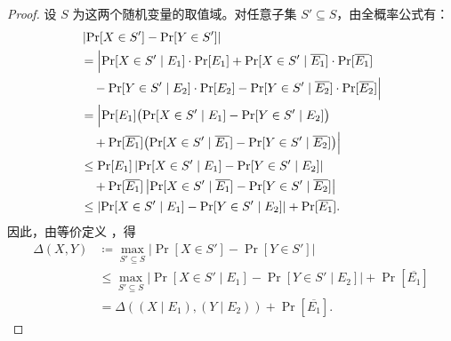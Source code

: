 \documentclass[american,singlepageview]{snargs-book-zh}
\newcommand{\DefineEqual}{\coloneqq}
\newcommand{\Event}{E}
\newcommand{\ConditionedOn}{\;\vert\;}
\newcommand{\RandomVariableX}{X}
\newcommand{\RandomVariableY}{Y}
\newcommand{\RandomVariableSupport}{S}
\newcommand{\StatisticalDistanceSymbol}{\Delta}
\newcommand{\StatisticalDistance}[2]{\StatisticalDistanceSymbol\left(#1,#2\right)}
\newcommand{\Negate}[1]{\overline{#1}}
\newcommand{\AbsValue}[1]{\left|{#1}\right|}
\begin{document}
\begin{proof}
设 $\RandomVariableSupport$ 为这两个随机变量的取值域。对任意子集 $\RandomVariableSupport' \subseteq \RandomVariableSupport$，由全概率公式有：
\begin{align*}
&
\AbsValue{\Pr[\RandomVariableX \in \RandomVariableSupport'] - \Pr[\RandomVariableY \in \RandomVariableSupport']}
\\ &=
\Bigl\lvert
\Pr[\RandomVariableX \in \RandomVariableSupport' \ConditionedOn \Event_{1}]\cdot \Pr[\Event_{1}]
+
\Pr[\RandomVariableX \in \RandomVariableSupport' \ConditionedOn \Negate{\Event_{1}}]\cdot \Pr[\Negate{\Event_{1}}]
\\ &\quad
-
\Pr[\RandomVariableY \in \RandomVariableSupport' \ConditionedOn \Event_{2}]\cdot \Pr[\Event_{2}]
-
\Pr[\RandomVariableY \in \RandomVariableSupport' \ConditionedOn \Negate{\Event_{2}}]\cdot \Pr[\Negate{\Event_{2}}]
\Bigr\rvert
\\ &=
\Bigl\lvert
\Pr[\Event_{1}]\bigl(\Pr[\RandomVariableX \in \RandomVariableSupport' \ConditionedOn \Event_{1}]-\Pr[\RandomVariableY \in \RandomVariableSupport' \ConditionedOn \Event_{2}]\bigr)
\\ &\quad
+
\Pr[\Negate{\Event_{1}}]\bigl(\Pr[\RandomVariableX \in \RandomVariableSupport' \ConditionedOn \Negate{\Event_{1}}]-\Pr[\RandomVariableY \in \RandomVariableSupport' \ConditionedOn \Negate{\Event_{2}}]\bigr)
\Bigr\rvert
\\ &\leq
\Pr[\Event_{1}]\AbsValue{\Pr[\RandomVariableX \in \RandomVariableSupport' \ConditionedOn \Event_{1}]-\Pr[\RandomVariableY \in \RandomVariableSupport' \ConditionedOn \Event_{2}]}
\\ &\quad
+
\Pr[\Negate{\Event_{1}}]\AbsValue{\Pr[\RandomVariableX \in \RandomVariableSupport' \ConditionedOn \Negate{\Event_{1}}]-\Pr[\RandomVariableY \in \RandomVariableSupport' \ConditionedOn \Negate{\Event_{2}}]}
\\ &\leq
\AbsValue{\Pr[\RandomVariableX \in \RandomVariableSupport' \ConditionedOn \Event_{1}]-\Pr[\RandomVariableY \in \RandomVariableSupport' \ConditionedOn \Event_{2}]}
+
\Pr[\Negate{\Event_{1}}].
\end{align*}
因此，由等价定义 ，得
\begin{align*}
\StatisticalDistance{\RandomVariableX}{\RandomVariableY}
&\DefineEqual
\max_{\RandomVariableSupport' \subseteq \RandomVariableSupport}\AbsValue{\Pr[\RandomVariableX \in \RandomVariableSupport'] - \Pr[\RandomVariableY \in \RandomVariableSupport']}
\\ &\leq
\max_{\RandomVariableSupport' \subseteq \RandomVariableSupport}\AbsValue{\Pr[\RandomVariableX \in \RandomVariableSupport' \ConditionedOn \Event_{1}] - \Pr[\RandomVariableY \in \RandomVariableSupport' \ConditionedOn \Event_{2}]}
+ \Pr[\Negate{\Event_{1}}]
\\ &=
\StatisticalDistance{(\RandomVariableX \ConditionedOn \Event_{1})}{(\RandomVariableY \ConditionedOn \Event_{2})}
+ \Pr[\Negate{\Event_{1}}].
\end{align*}
\end{proof}
\end{document}
